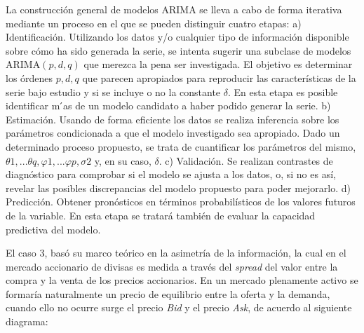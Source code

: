 \documentclass[
  american,
]{article}
\begin{document}
\autocite{casimiro_alisis_nodate}La construcción general de modelos
ARIMA se lleva a cabo de forma iterativa mediante un proceso en el que
se pueden distinguir cuatro etapas: a) Identificación. Utilizando los
datos y/o cualquier tipo de información disponible sobre cómo ha sido
generada la serie, se intenta sugerir una subclase de modelos
ARIMA\((p, d, q)\) que merezca la pena ser investigada. El objetivo es
determinar los órdenes \(p,d,q\) que parecen apropiados para reproducir
las características de la serie bajo estudio y si se incluye o no la
constante \(δ\). En esta etapa es posible identificar m ́as de un modelo
candidato a haber podido generar la serie. b) Estimación. Usando de
forma eficiente los datos se realiza inferencia sobre los parámetros
condicionada a que el modelo investigado sea apropiado. Dado un
determinado proceso propuesto, se trata de cuantificar los parámetros
del mismo, \(θ1,...θq, φ1,...φp , σ2\) y, en su caso, \(δ\). c)
Validación. Se realizan contrastes de diagnóstico para comprobar si el
modelo se ajusta a los datos, o, si no es así, revelar las posibles
discrepancias del modelo propuesto para poder mejorarlo. d) Predicción.
Obtener pronósticos en términos probabilísticos de los valores futuros
de la variable. En esta etapa se tratará también de evaluar la capacidad
predictiva del modelo.

El caso 3, basó su marco teórico en la asimetría de la información, la
cual en el mercado accionario de divisas es medida a través del
\emph{spread} del valor entre la compra y la venta de los precios
accionarios. En un mercado plenamente activo se formaría naturalmente un
precio de equilibrio entre la oferta y la demanda, cuando ello no ocurre
surge el precio \emph{Bid} y el precio
\emph{Ask}\autocite{hanns_de_la_fuente-mella_econometric_2020}, de
acuerdo al siguiente diagrama:

\end{document}
